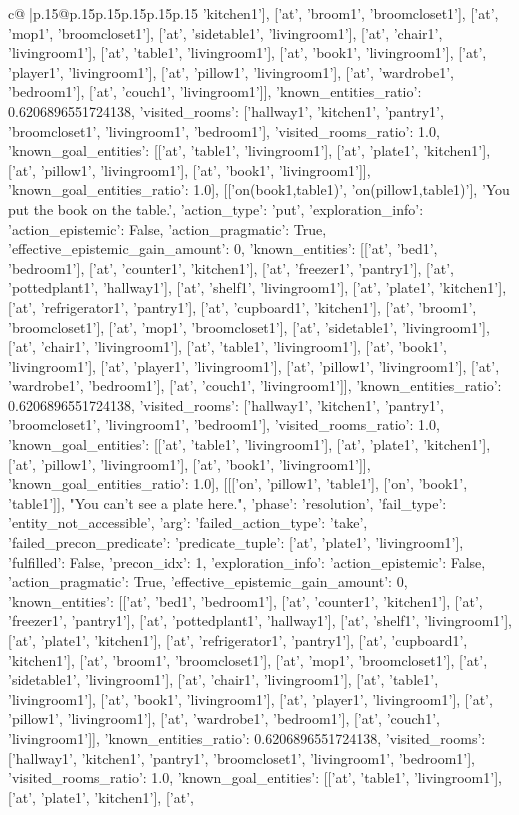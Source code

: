 \documentclass{article}
\begin{document}
{\begin{supertabular}{c@{$\;$}|p{.15\linewidth}@{}p{.15\linewidth}p{.15\linewidth}p{.15\linewidth}p{.15\linewidth}p{.15\linewidth}}
{{{'kitchen1'], ['at', 'broom1', 'broomcloset1'], ['at', 'mop1', 'broomcloset1'], ['at', 'sidetable1', 'livingroom1'], ['at', 'chair1', 'livingroom1'], ['at', 'table1', 'livingroom1'], ['at', 'book1', 'livingroom1'], ['at', 'player1', 'livingroom1'], ['at', 'pillow1', 'livingroom1'], ['at', 'wardrobe1', 'bedroom1'], ['at', 'couch1', 'livingroom1']], 'known_entities_ratio': 0.6206896551724138, 'visited_rooms': ['hallway1', 'kitchen1', 'pantry1', 'broomcloset1', 'livingroom1', 'bedroom1'], 'visited_rooms_ratio': 1.0, 'known_goal_entities': [['at', 'table1', 'livingroom1'], ['at', 'plate1', 'kitchen1'], ['at', 'pillow1', 'livingroom1'], ['at', 'book1', 'livingroom1']], 'known_goal_entities_ratio': 1.0}}], [['on(book1,table1)', 'on(pillow1,table1)'], 'You put the book on the table.', {'action_type': 'put', 'exploration_info': {'action_epistemic': False, 'action_pragmatic': True, 'effective_epistemic_gain_amount': 0, 'known_entities': [['at', 'bed1', 'bedroom1'], ['at', 'counter1', 'kitchen1'], ['at', 'freezer1', 'pantry1'], ['at', 'pottedplant1', 'hallway1'], ['at', 'shelf1', 'livingroom1'], ['at', 'plate1', 'kitchen1'], ['at', 'refrigerator1', 'pantry1'], ['at', 'cupboard1', 'kitchen1'], ['at', 'broom1', 'broomcloset1'], ['at', 'mop1', 'broomcloset1'], ['at', 'sidetable1', 'livingroom1'], ['at', 'chair1', 'livingroom1'], ['at', 'table1', 'livingroom1'], ['at', 'book1', 'livingroom1'], ['at', 'player1', 'livingroom1'], ['at', 'pillow1', 'livingroom1'], ['at', 'wardrobe1', 'bedroom1'], ['at', 'couch1', 'livingroom1']], 'known_entities_ratio': 0.6206896551724138, 'visited_rooms': ['hallway1', 'kitchen1', 'pantry1', 'broomcloset1', 'livingroom1', 'bedroom1'], 'visited_rooms_ratio': 1.0, 'known_goal_entities': [['at', 'table1', 'livingroom1'], ['at', 'plate1', 'kitchen1'], ['at', 'pillow1', 'livingroom1'], ['at', 'book1', 'livingroom1']], 'known_goal_entities_ratio': 1.0}}], [[['on', 'pillow1', 'table1'], ['on', 'book1', 'table1']], "You can't see a plate here.", {'phase': 'resolution', 'fail_type': 'entity_not_accessible', 'arg': {'failed_action_type': 'take', 'failed_precon_predicate': {'predicate_tuple': ['at', 'plate1', 'livingroom1'], 'fulfilled': False, 'precon_idx': 1}}, 'exploration_info': {'action_epistemic': False, 'action_pragmatic': True, 'effective_epistemic_gain_amount': 0, 'known_entities': [['at', 'bed1', 'bedroom1'], ['at', 'counter1', 'kitchen1'], ['at', 'freezer1', 'pantry1'], ['at', 'pottedplant1', 'hallway1'], ['at', 'shelf1', 'livingroom1'], ['at', 'plate1', 'kitchen1'], ['at', 'refrigerator1', 'pantry1'], ['at', 'cupboard1', 'kitchen1'], ['at', 'broom1', 'broomcloset1'], ['at', 'mop1', 'broomcloset1'], ['at', 'sidetable1', 'livingroom1'], ['at', 'chair1', 'livingroom1'], ['at', 'table1', 'livingroom1'], ['at', 'book1', 'livingroom1'], ['at', 'player1', 'livingroom1'], ['at', 'pillow1', 'livingroom1'], ['at', 'wardrobe1', 'bedroom1'], ['at', 'couch1', 'livingroom1']], 'known_entities_ratio': 0.6206896551724138, 'visited_rooms': ['hallway1', 'kitchen1', 'pantry1', 'broomcloset1', 'livingroom1', 'bedroom1'], 'visited_rooms_ratio': 1.0, 'known_goal_entities': [['at', 'table1', 'livingroom1'], ['at', 'plate1', 'kitchen1'], ['at', }}}
\end{supertabular}}
\end{document}
